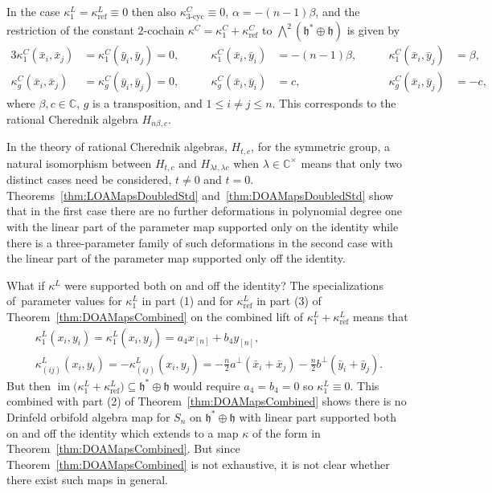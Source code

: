 \documentclass[pdftex]{sigma}
\numberwithin{equation}{section}
\DeclareMathOperator{\im}{im}
\DeclareMathOperator{\refl}{ref}
\DeclareMathOperator{\tri}{3-cyc}
\begin{document}
\begin{Remark}\label{RecoverGHAs}
In the case $\kappa^L_1=\kappa^L_{\refl} \equiv 0$ then also $\kappa^C_{\tri}\equiv 0$,
$\alpha=-(n-1)\beta$, and the restriction of the constant $2$-cochain
$\kappa^C=\kappa^C_1+\kappa^C_{\refl}$ to $\bigwedge^2 (\mathfrak{h}^*\oplus\mathfrak{h})$ is given by
\begin{alignat*}{3}
\kappa^C_1(\bar{x}_i,\bar{x}_j)&=\kappa^C_1(\bar{y}_i,\bar{y}_j)=0, &\qquad \kappa^C_1(\bar{x}_i,\bar{y}_i)&=-(n-1)\beta, &\qquad \kappa^C_1(\bar{x}_i,\bar{y}_j)&=\beta,
\\
\kappa^C_g(\bar{x}_i,\bar{x}_j)&=\kappa^C_g(\bar{y}_i,\bar{y}_j)=0, &\qquad \kappa^C_g(\bar{x}_i,\bar{y}_i)&=c, &\qquad \kappa^C_g(\bar{x}_i,\bar{y}_j)&=-c,
\end{alignat*}
where $\beta,c \in \mathbb{C}$, $g$ is a transposition, and $1 \leq i \neq j \leq n$.
This corresponds to the rational Cherednik algebra $H_{n\beta,c}$.
\end{Remark}

In the theory of rational Cherednik algebras, $H_{t,c}$, for the
symmetric group, a natural isomorphism between $H_{t,c}$ and
$H_{\lambda t, \lambda c}$ when $\lambda \in \mathbb{C}^\times$
means that only two distinct cases need be considered, $t\neq 0$ and $t=0$.
Theorems~\ref{thm:LOAMapsDoubledStd} and~\ref{thm:DOAMapsDoubledStd}
show that in the first case there are no further deformations in polynomial
degree one with the linear part of the parameter map supported only on the
identity while there is a three-parameter family of such deformations in the
second case with the linear part of the parameter map supported only off the
identity.

\begin{Remark}\label{NoExtensionsOfExamples}
What if $\kappa^L$ were supported both on and off the
identity? The specializations of~parameter values for $\kappa^L_1$ in
part (1) and for $\kappa^L_{\refl}$ in part (3) of
Theorem~\ref{thm:DOAMapsCombined} on the combined lift of
$\kappa^L_1+\kappa^L_{\refl}$ means that
\begin{gather*}
\kappa^L_1(x_i,y_i)=\kappa^L_1(x_i,y_j)=a_4x_{[n]}+b_4y_{[n]},
\\
\kappa^L_{(ij)}(x_i,y_i)=-\kappa^L_{(ij)}(x_i,y_j)=
-\frac{n}{2}a^\perp(\bar{x}_i+\bar{x}_j)
-\frac{n}{2}b^\perp(\bar{y}_i+\bar{y}_j).
\end{gather*}
But then $\im\big(\kappa^L_1+\kappa^L_{\refl}\big) \subseteq \mathfrak{h}^*\oplus\mathfrak{h}$ would
require $a_4=b_4=0$ so $\kappa^L_1\equiv 0$. This combined with part (2) of
Theorem~\ref{thm:DOAMapsCombined} shows there is no Drinfeld orbifold
algebra map for $S_n$ on $\mathfrak{h}^*\oplus\mathfrak{h}$ with linear part supported both on
and off the identity which extends to a map $\kappa$ of the form in
Theorem~\ref{thm:DOAMapsCombined}. But since Theorem~\ref{thm:DOAMapsCombined}
is not exhaustive, it is not clear whether there exist such maps in general.
\end{Remark}
\end{document}
